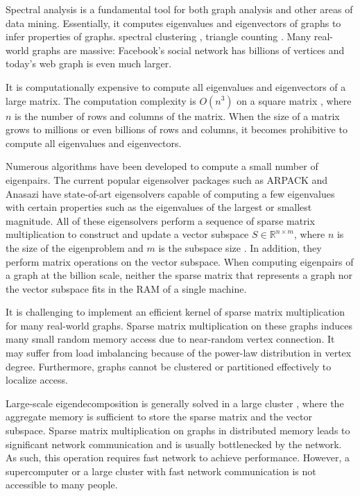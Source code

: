 Spectral analysis \cite{} is a fundamental tool for both graph analysis and
other areas of data mining. Essentially, it computes
eigenvalues and eigenvectors of graphs to infer properties of graphs.
spectral clustering \cite{Ng01, Sussman12}, triangle counting \cite{Tsourakakis08}.
Many real-world graphs are massive: Facebook's social network has billions
of vertices and today's web graph is even much larger.


It is computationally expensive to compute all eigenvalues and
eigenvectors of a large matrix. The computation complexity is
$O(n^3)$ on a square matrix \cite{Pan99}, where $n$ is the number of rows
and columns of the matrix.
When the size of a matrix grows to millions or even billions of rows and
columns, it becomes prohibitive to compute all eigenvalues and
eigenvectors.

Numerous algorithms \cite{Lanczos, IRLM, krylovschur, Arbenz05} have been
developed to compute a small number of eigenpairs.
The current popular eigensolver packages such as ARPACK \cite{arpack}
and Anasazi \cite{anasazi} have state-of-art eigensolvers
capable of computing a few eigenvalues with certain properties such as
the eigenvalues of the largest or smallest magnitude. All of these eigensolvers
perform a sequence of sparse matrix multiplication to construct and update
a vector subspace $S \in \mathbb{R}^{n \times m}$, where $n$ is the size of
the eigenproblem and $m$ is the subspace size \cite{Arbenz05}. In addition,
they perform matrix operations on the vector subspace. When computing eigenpairs
of a graph at the billion scale, neither the sparse matrix that represents
a graph nor the vector subspace fits in the RAM of a single machine.

It is challenging to implement an efficient kernel of sparse matrix
multiplication for many real-world graphs. Sparse matrix multiplication
on these graphs induces many small random memory access due to near-random
vertex connection. It may suffer from load imbalancing because of
the power-law distribution in vertex degree. Furthermore, graphs cannot be
clustered or partitioned effectively \cite{leskovec} to localize access.

Large-scale eigendecomposition is generally solved in a large cluster
\cite{anasazi, slepc}, where the aggregate memory is sufficient to store
the sparse matrix and the vector subspace. Sparse matrix multiplication
on graphs in distributed memory leads to significant network communication
and is usually bottlenecked by the network. As such, this operation requires
fast network to achieve performance. However, a supercomputer or a large
cluster with fast network communication is not accessible to many people.

